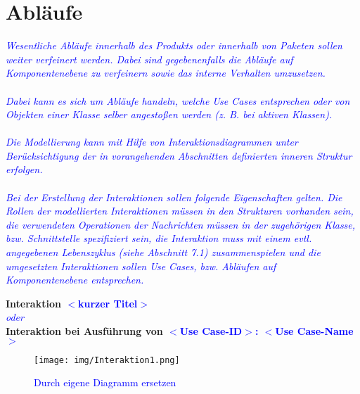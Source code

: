 \section{Abläufe}
\textcolor{blue}{\textit{Wesentliche Abläufe innerhalb des Produkts oder innerhalb von Paketen sollen weiter verfeinert werden. Dabei sind gegebenenfalls die Abläufe auf Komponentenebene zu verfeinern sowie das interne Verhalten umzusetzen.\\\\
Dabei kann es sich um Abläufe handeln, welche Use Cases entsprechen oder von Objekten einer Klasse selber angestoßen werden (z. B.  bei aktiven Klassen). \\\\
Die Modellierung kann mit Hilfe von Interaktionsdiagrammen unter Berücksichtigung der in vorangehenden Abschnitten definierten inneren Struktur erfolgen. \\\\
Bei der Erstellung der Interaktionen sollen folgende Eigenschaften gelten. Die Rollen der modellierten Interaktionen müssen in den Strukturen vorhanden sein, die verwendeten Operationen der Nachrichten müssen in der zugehörigen Klasse, bzw. Schnittstelle spezifiziert sein, die Interaktion muss mit einem evtl. angegebenen Lebenszyklus (siehe Abschnitt 7.1) zusammenspielen und die umgesetzten Interaktionen sollen Use Cases, bzw. Abläufen auf Komponentenebene entsprechen.
}}

\textbf{Interaktion \textcolor{blue}{$<$kurzer Titel$>$}}\\
\textit{\textcolor{blue}{oder}}\\
\textbf{Interaktion bei Ausführung von \textcolor{blue}{$<$Use Case-ID$>$: $<$Use Case-Name$>$}}\\

\begin{figure}[H]
\centering
\texttt{[image: img/Interaktion1.png]}
\caption{\textcolor{blue}{Durch eigene Diagramm ersetzen}}
\label{Interaktion1}
\end{figure}
